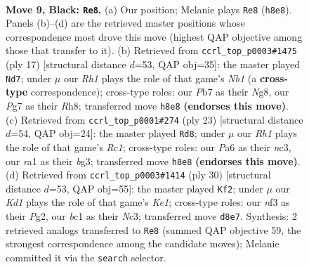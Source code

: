 \documentclass[11pt]{article}
\begin{document}
\clearpage

\begin{figure}[p]\centering
\begin{subfigure}{0.46\textwidth}\centering
\resizebox{\linewidth}{!}{%
\newchessgame
\chessboard[
  setfen={rnbk3r/1p3ppp/p3pn2/2b5/8/1B2PN2/PP3PPP/RNB2RK1 b - - 1 9},
  showmover=false,
  pgfstyle=straightmove, color=movearrow, markmove={h8-e8}
]}
\caption{}
\end{subfigure}\hfill
\begin{subfigure}{0.46\textwidth}\centering
\resizebox{\linewidth}{!}{%
\newchessgame
\chessboard[
  setfen={rn1k2nr/ppp3bp/4bpp1/4p3/2P5/1PN1PN2/PB3PPP/R3KB1R b KQ - 2 9},
  showmover=false,
  pgfstyle=straightmove, color=movearrow, markmove={b8-d7}
]}
\caption{}
\end{subfigure}
\\[4pt]
\begin{subfigure}{0.46\textwidth}\centering
\resizebox{\linewidth}{!}{%
\newchessgame
\chessboard[
  setfen={2r1kb1r/1p3ppp/p1n1bn2/2p5/8/2N3B1/PPP2PPP/2KR1BNR b - - 4 12},
  showmover=false,
  pgfstyle=straightmove, color=movearrow, markmove={c8-d8}
]}
\caption{}
\end{subfigure}\hfill
\begin{subfigure}{0.46\textwidth}\centering
\resizebox{\linewidth}{!}{%
\newchessgame
\chessboard[
  setfen={r3kb1r/3p1ppp/p1b1pn2/8/4P3/P1NBBP2/2P3PP/R3K2R w KQkq - 1 16},
  showmover=false,
  pgfstyle=straightmove, color=movearrow, markmove={e1-f2}
]}
\caption{}
\end{subfigure}
\caption{\textbf{Move 9, Black: \texttt{Re8}.} (a) Our position; Melanie plays \texttt{Re8} (\texttt{h8e8}). Panels (b)--(d) are the retrieved master positions whose correspondence most drove this move (highest QAP objective among those that transfer to it). (b) Retrieved from \texttt{ccrl\_top\_p0003\#1475} (ply 17) [structural distance $d$=53, QAP obj=35]: the master played \texttt{Nd7}; under $\mu$ our \emph{Rh1} plays the role of that game's \emph{Nb1} (a \textbf{cross-type} correspondence); cross-type roles: our \emph{P}b7 as their \emph{N}g8, our \emph{P}g7 as their \emph{R}h8; transferred move \texttt{h8e8} \textbf{(endorses this move)}. (c) Retrieved from \texttt{ccrl\_top\_p0001\#274} (ply 23) [structural distance $d$=54, QAP obj=24]: the master played \texttt{Rd8}; under $\mu$ our \emph{Rh1} plays the role of that game's \emph{Rc1}; cross-type roles: our \emph{P}a6 as their \emph{n}c3, our \emph{r}a1 as their \emph{b}g3; transferred move \texttt{h8e8} \textbf{(endorses this move)}. (d) Retrieved from \texttt{ccrl\_top\_p0003\#1414} (ply 30) [structural distance $d$=53, QAP obj=55]: the master played \texttt{Kf2}; under $\mu$ our \emph{Kd1} plays the role of that game's \emph{Ke1}; cross-type roles: our \emph{n}f3 as their \emph{P}g2, our \emph{b}c1 as their \emph{N}c3; transferred move \texttt{d8e7}. Synthesis: 2 retrieved analogs transferred to \texttt{Re8} (summed QAP objective 59, the strongest correspondence among the candidate moves); Melanie committed it via the \texttt{search} selector.}
\label{fig:thought-m17}
\end{figure}
\end{document}
